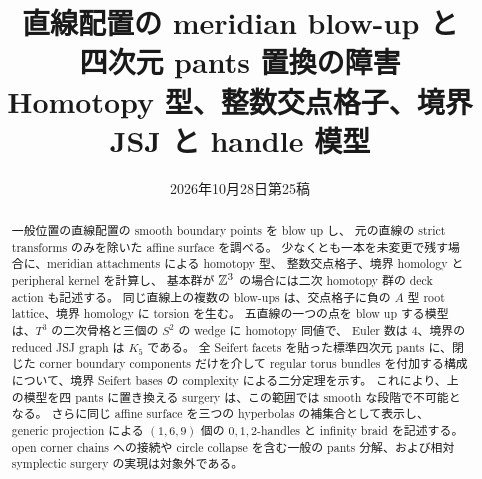 \documentclass[11pt,a4paper]{article}
\title{直線配置の meridian blow-up と\\四次元 pants 置換の障害\\[0.5em]
\large Homotopy 型、整数交点格子、境界 JSJ と handle 模型}
\author{}
\date{2026年10月28日\quad 第25稿}
\begin{document}
\maketitle
\begin{abstract}
一般位置の直線配置の smooth boundary points を blow up し、
元の直線の strict transforms のみを除いた affine surface を調べる。
少なくとも一本を未変更で残す場合に、meridian attachments による homotopy 型、
整数交点格子、境界 homology と peripheral kernel を計算し、
基本群が $\mathbb Z^3$ の場合には二次 homotopy 群の deck action も記述する。
同じ直線上の複数の blow-ups は、交点格子に負の $A$ 型 root lattice、境界 homology に torsion を生む。
五直線の一つの点を blow up する模型は、$T^3$ の二次骨格と三個の $S^2$ の wedge に homotopy 同値で、
Euler 数は $4$、境界の reduced JSJ graph は $K_5$ である。
全 Seifert facets を貼った標準四次元 pants に、閉じた corner boundary components だけを介して
regular torus bundles を付加する構成について、境界 Seifert bases の complexity による二分定理を示す。
これにより、上の模型を四 pants に置き換える surgery は、この範囲では smooth な段階で不可能となる。
さらに同じ affine surface を三つの hyperbolas の補集合として表示し、
generic projection による $(1,6,9)$ 個の $0,1,2$-handles と infinity braid を記述する。
open corner chains への接続や circle collapse を含む一般の pants 分解、および相対 symplectic surgery の実現は対象外である。
\end{abstract}
\tableofcontents




\end{document}
